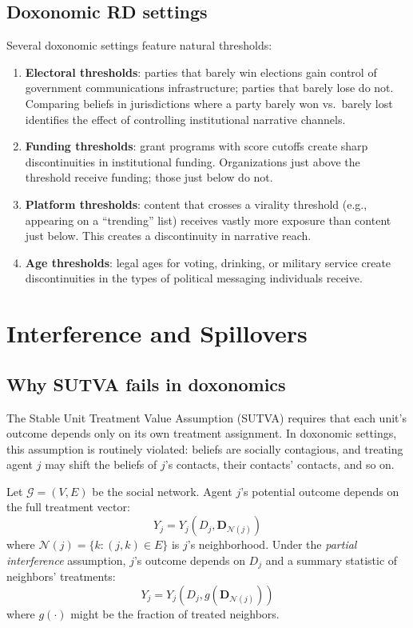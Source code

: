 \subsection{Doxonomic RD settings}

Several doxonomic settings feature natural thresholds:
\begin{enumerate}[nosep]
  \item \textbf{Electoral thresholds}: parties that barely win elections gain control of government communications infrastructure; parties that barely lose do not.
  Comparing beliefs in jurisdictions where a party barely won vs.\ barely lost identifies the effect of controlling institutional narrative channels.

  \item \textbf{Funding thresholds}: grant programs with score cutoffs create sharp discontinuities in institutional funding.
  Organizations just above the threshold receive funding; those just below do not.

  \item \textbf{Platform thresholds}: content that crosses a virality threshold (e.g., appearing on a ``trending'' list) receives vastly more exposure than content just below.
  This creates a discontinuity in narrative reach.

  \item \textbf{Age thresholds}: legal ages for voting, drinking, or military service create discontinuities in the types of political messaging individuals receive.
\end{enumerate}

\section{Interference and Spillovers}
\label{sec:ch16-interference}

\subsection{Why SUTVA fails in doxonomics}

The Stable Unit Treatment Value Assumption (SUTVA) requires that each unit's outcome depends only on its own treatment assignment.
In doxonomic settings, this assumption is routinely violated: beliefs are socially contagious, and treating agent $j$ may shift the beliefs of $j$'s contacts, their contacts' contacts, and so on.

\begin{definition}
\label{def:interference}
Let $\mathcal{G} = (V, E)$ be the social network.
Agent $j$'s potential outcome depends on the full treatment vector:
\[
  Y_j = Y_j(D_j, \mathbf{D}_{\mathcal{N}(j)})
\]
where $\mathcal{N}(j) = \{k : (j,k) \in E\}$ is $j$'s neighborhood.
Under the \emph{partial interference} assumption, $j$'s outcome depends on $D_j$ and a summary statistic of neighbors' treatments:
\[
  Y_j = Y_j(D_j, g(\mathbf{D}_{\mathcal{N}(j)}))
\]
where $g(\cdot)$ might be the fraction of treated neighbors.
\end{definition}

